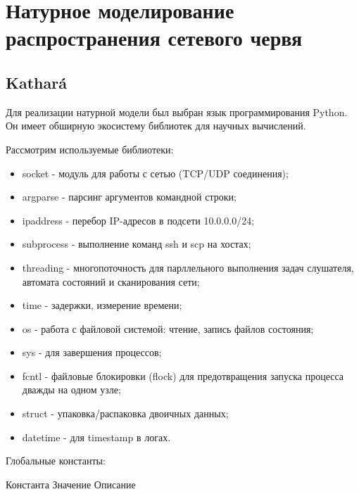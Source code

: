 \documentclass[
  english,
  russian,
  12pt,
  a4paper,
]{phdthesr}
\providecommand{\tightlist}{%
  \setlength{\itemsep}{0pt}\setlength{\parskip}{0pt}}
\begin{document}
\section{Натурное моделирование распространения сетевого
червя}\label{ux43dux430ux442ux443ux440ux43dux43eux435-ux43cux43eux434ux435ux43bux438ux440ux43eux432ux430ux43dux438ux435-ux440ux430ux441ux43fux440ux43eux441ux442ux440ux430ux43dux435ux43dux438ux44f-ux441ux435ux442ux435ux432ux43eux433ux43e-ux447ux435ux440ux432ux44f}

\subsection{Kathará}\label{katharuxe1-1}

Для реализации натурной модели был выбран язык программирования Python.
Он имеет обширную экосистему библиотек для научных вычислений.

Рассмотрим используемые библиотеки:

\begin{itemize}
\tightlist
\item
  socket - модуль для работы с сетью (TCP/UDP соединения);
\item
  argparse - парсинг аргументов командной строки;
\item
  ipaddress - перебор IP-адресов в подсети 10.0.0.0/24;
\item
  subprocess - выполнение команд ssh и scp на хостах;
\item
  threading - многопоточность для парллельного выполнения задач
  слушателя, автомата состояний и сканирования сети;
\item
  time - задержки, измерение времени;
\item
  os - работа с файловой системой: чтение, запись файлов состояния;
\item
  sys - для завершения процессов;
\item
  fcntl - файловые блокировки (flock) для предотвращения запуска
  процесса дважды на одном узле;
\item
  struct - упаковка/распаковка двоичных данных;
\item
  datetime - для timestamp в логах.
\end{itemize}

Глобальные константы:

Константа \textbar{} Значение \textbar{} Описание \textbar{}
\end{document}
